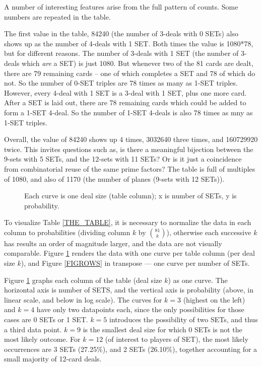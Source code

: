 \documentclass[10pt]{amsart}
\newcommand{\SET}{SET\texttrademark}  %
\begin{document}
A number of interesting features arise from the full pattern of counts. Some
numbers are repeated in the table.

The first value in the table, 84240 (the number of 3-deals with 0 SETs) also
shows up as the number of 4-deals with 1 SET. Both times the value is 1080*78,
but for different reasons. The number of 3-deals with 1 SET (the number of
3-deals which {\em are} a SET) is just 1080. But whenever two of the 81 cards
are dealt, there are 79 remaining cards -- one of which completes a SET and 78
of which do not. So the number of 0-SET triples are 78 times as many as 1-SET
triples. However, every 4-deal with 1 SET is a 3-deal with 1 SET, plus one more
card. After a SET is laid out, there are 78 remaining cards which could be added
to form a 1-SET 4-deal. So the number of 1-SET 4-deals is also 78 times as mny
as 1-SET triples.

Overall, the value of 84240 shows up 4 times, 3032640 three times, and 160729920
twice. This invites questions such as, is there a meaningful bijection between
the 9-sets with 5 SETs, and the 12-sets with 11 SETs? Or is it just a
coincidence from combinatorial reuse of the same prime factors? The table is
full of multiples of 1080, and also of 1170 (the number of planes (9-sets with
12 SETs)).

\begin{figure}[!htb]
  \caption{\label{FIGCOLS} Each curve is one deal size (table column); x is
    number of SETs, y is probability.}
\end{figure}

To visualize Table \ref{THE_TABLE}, it is necessary to normalize the data in
each column to probabilities (dividing column $k$ by $\binom{81}{k}$), otherwise
each successive $k$ has results an order of magnitude larger, and the data are
not visually comparable. Figure \ref{FIGCOLS} renders the data with one curve
per table column (per deal size $k$), and Figure \ref{FIGROWS} in transpose ---
one curve per number of SETs. 

Figure \ref{FIGCOLS} graphs each column of the table (deal size $k$) as one
curve. The horizontal axis is number of SETS, and the vertical axis is 
probability (above, in linear scale, and below in log scale). The curves for
$k=3$ (highest on the left) and $k=4$ have only two datapoints each, since the
only possibilities for those cases are 0 SETs or 1 SET. $k=5$ introduces the
possibility of two SETs, and thus a third data point. $k=9$ is the smallest deal
size for which 0 SETs is not the most likely outcome. For $k=12$ (of interest to
players of \SET), the most likely occurrences are 3 SETs (27.25\%), and 2 SETs
(26.10\%), together accounting for a small majority of 12-card deals.
\end{document}
